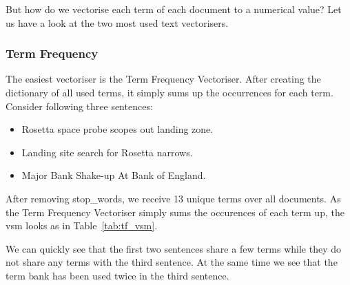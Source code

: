 But how do we vectorise each term of each document to a numerical value?
Let us have a look at the two most used text vectorisers.

\subsubsection{Term Frequency}
The easiest vectoriser is the Term Frequency Vectoriser.
After creating the dictionary of all used terms, it simply sums up the occurrences for each term.
Consider following three sentences:

\begin{itemize}
    \item Rosetta space probe scopes out landing zone.
    \item Landing site search for Rosetta narrows.
    \item Major Bank Shake-up At Bank of England.
\end{itemize}

After removing \Glspl{stop_word}, we receive 13 unique terms over all documents.
As the Term Frequency Vectoriser simply sums the occurences of each term up,
the \Gls{vsm} looks as in Table~\ref{tab:tf_vsm}.

\begin{table}[h]
    \centering
    \caption{Term Frequency \Gls{vsm}.}
    \label{tab:tf_vsm}
\end{table}

We can quickly see that the first two sentences share a few terms while they do not share any terms with the third sentence.
At the same time we see that the term bank has been used twice in the third sentence.


